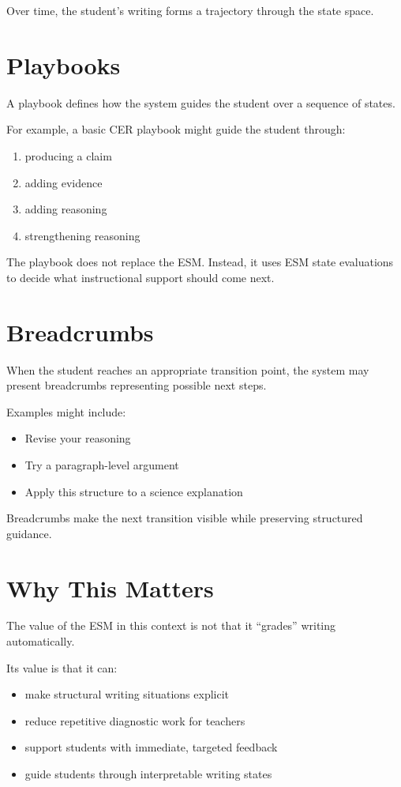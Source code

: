 \documentclass[11pt]{article}
\begin{document}
Over time, the student's writing forms a trajectory through the state space.

\section{Playbooks}

A playbook defines how the system guides the student over a sequence of states.

For example, a basic CER playbook might guide the student through:

\begin{enumerate}
\item producing a claim
\item adding evidence
\item adding reasoning
\item strengthening reasoning
\end{enumerate}

The playbook does not replace the ESM. Instead, it uses ESM state evaluations to decide what instructional support should come next.

\section{Breadcrumbs}

When the student reaches an appropriate transition point, the system may present breadcrumbs representing possible next steps.

Examples might include:

\begin{itemize}
\item Revise your reasoning
\item Try a paragraph-level argument
\item Apply this structure to a science explanation
\end{itemize}

Breadcrumbs make the next transition visible while preserving structured guidance.

\section{Why This Matters}

The value of the ESM in this context is not that it ``grades'' writing automatically.

Its value is that it can:

\begin{itemize}
\item make structural writing situations explicit
\item reduce repetitive diagnostic work for teachers
\item support students with immediate, targeted feedback
\item guide students through interpretable writing states
\end{itemize}
\end{document}
